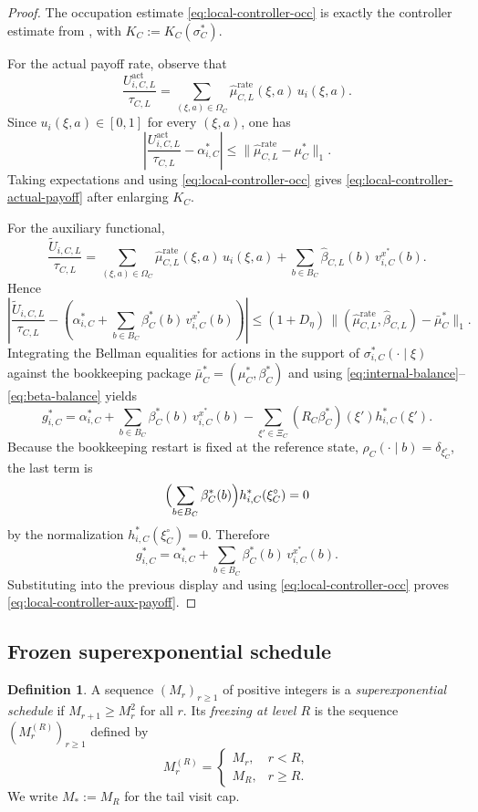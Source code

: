 \documentclass[12pt]{article}
\theoremstyle{definition}
\newtheorem{definition}[theorem]{Definition}
\newcommand{\1}{\mathbf{1}}
\begin{document}
\begin{proof}
The occupation estimate \eqref{eq:local-controller-occ} is exactly the controller
estimate from , with $K_C:=K_C(\sigma_C^*)$.

For the actual payoff rate, observe that
\[
\frac{U_{i,C,L}^{\mathrm{act}}}{\tau_{C,L}}
=
\sum_{(\xi,a)\in\Omega_C}
\widehat\mu_{C,L}^{\mathrm{rate}}(\xi,a)\,u_i(\xi,a).
\]
Since $u_i(\xi,a)\in[0,1]$ for every $(\xi,a)$, one has
\[
\left|
\frac{U_{i,C,L}^{\mathrm{act}}}{\tau_{C,L}}
-
\alpha_{i,C}^*
\right|
\le
\| \widehat\mu_{C,L}^{\mathrm{rate}}-\mu_C^*\|_1.
\]
Taking expectations and using \eqref{eq:local-controller-occ} gives
\eqref{eq:local-controller-actual-payoff} after enlarging $K_C$.

For the auxiliary functional,
\[
\frac{\widetilde U_{i,C,L}}{\tau_{C,L}}
=
\sum_{(\xi,a)\in\Omega_C}
\widehat\mu_{C,L}^{\mathrm{rate}}(\xi,a)\,u_i(\xi,a)
+
\sum_{b\in B_C}
\widehat\beta_{C,L}(b)\,v_{i,C}^{x^*}(b).
\]
Hence
\[
\left|
\frac{\widetilde U_{i,C,L}}{\tau_{C,L}}
-
\left(
\alpha_{i,C}^*
+
\sum_{b\in B_C}\beta_C^*(b)\,v_{i,C}^{x^*}(b)
\right)
\right|
\le
(1+D_\eta)\,
\|(\widehat\mu_{C,L}^{\mathrm{rate}},\widehat\beta_{C,L})-\bar\mu_C^*\|_1.
\]
Integrating the Bellman equalities for actions in the support of
$\sigma_{i,C}^*(\cdot\mid\xi)$ against the bookkeeping package
$\bar\mu_C^*=(\mu_C^*,\beta_C^*)$ and using
\eqref{eq:internal-balance}--\eqref{eq:beta-balance} yields
\begin{equation}
\label{eq:node-gain-identity}
g_{i,C}^*
=
\alpha_{i,C}^*
+
\sum_{b\in B_C}\beta_C^*(b)\,v_{i,C}^{x^*}(b)
-
\sum_{\xi'\in\Xi_C}(R_C\beta_C^*)(\xi')h_{i,C}^*(\xi').
\end{equation}
Because the bookkeeping restart is fixed at the reference state,
$\rho_C(\cdot\mid b)=\delta_{\xi_C^\circ}$, the last term is
\[
\Bigl(\sum_{b\in B_C}\beta_C^*(b)\Bigr)h_{i,C}^*(\xi_C^\circ)=0
\]
by the normalization $h_{i,C}^*(\xi_C^\circ)=0$. Therefore
\[
g_{i,C}^*
=
\alpha_{i,C}^*
+
\sum_{b\in B_C}\beta_C^*(b)\,v_{i,C}^{x^*}(b).
\]
Substituting into the previous display and using
\eqref{eq:local-controller-occ} proves
\eqref{eq:local-controller-aux-payoff}.
\end{proof}

\subsection{Frozen superexponential schedule}

\begin{definition}
A sequence $(M_r)_{r\ge 1}$ of positive integers is a
\emph{superexponential schedule} if $M_{r+1}\ge M_r^2$ for all $r$. Its
\emph{freezing at level $R$} is the sequence $(M_r^{(R)})_{r\ge 1}$ defined by
\[
M_r^{(R)}=
\begin{cases}
M_r, & r<R,\\
M_R, & r\ge R.
\end{cases}
\]
We write $M_*:=M_R$ for the tail visit cap.
\end{definition}
\end{document}
